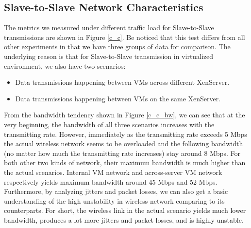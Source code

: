 \documentclass[journal,comsoc]{IEEEtran}
\begin{document}
\subsection{Slave-to-Slave Network Characteristics}
The metrics we measured under different traffic load for Slave-to-Slave transmissions are shown in Figure \ref{c_c}. Be noticed that this test differs from all other experiments in that we have three groups of data for comparison. The underlying reason is that for Slave-to-Slave transmission in virtualized environment, we also have two scenarios:
\begin{itemize}
	\item Data transmissions happening between VMs across different XenServer.
	\item Data transmissions happening between VMs on the same XenServer.
\end{itemize}
From the bandwidth tendency shown in Figure \ref{c_c_bw}, we can see that at the very beginning, the bandwidth of all three scenarios increases with the transmitting rate. However, immediately as the transmitting rate exceeds 5 Mbps the actual wireless network seems to be overloaded and the following bandwidth (no matter how much the transmitting rate increases) stay around 8 Mbps. For both other two kinds of network, their maximum bandwidth is much higher than the actual scenarios. Internal VM network and across-server VM network respectively yields maximum bandwidth around 45 Mbps and 52 Mbps. Furthermore, by analyzing jitters and packet losses, we can also get a basic understanding of the high unstability in wireless network comparing to its counterparts. For short, the wireless link in the actual scenario yields much lower bandwidth, produces a lot more jitters and packet losses, and is highly unstable.
\end{document}

